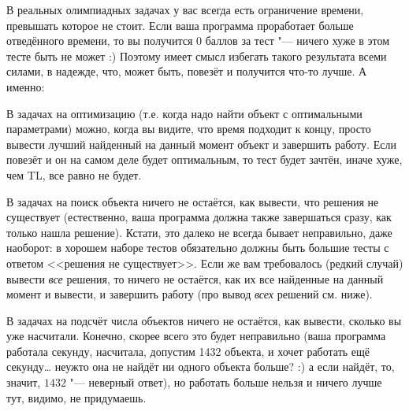 
В реальных олимпиадных задачах у вас всегда есть ограничение времени, превышать которое не 
стоит. Если ваша программа проработает больше отведённого времени, то вы получится $0$ баллов за 
тест "--- ничего хуже в этом тесте быть не может :) Поэтому имеет смысл избегать такого 
результата всеми силами, в надежде, что, может быть, повезёт и получится что-то лучше. А именно:

\begin{ulist}
\item В задачах на оптимизацию (т.е. когда надо найти объект с оптимальными параметрами) можно, 
  когда вы видите, что время подходит к концу, просто вывести лучший найденный на данный 
  момент объект и завершить работу. Если повезёт и он на самом деле будет 
  оптимальным, то тест будет зачтён, иначе хуже, чем TL, все равно не будет.
\item В задачах на поиск объекта ничего не остаётся, как вывести, что решения не 
  существует (естественно, ваша программа должна также завершаться сразу, как только нашла решение). Кстати, это далеко не всегда бывает неправильно, даже наоборот: в хорошем наборе тестов обязательно должны быть большие тесты с ответом <<решения не существует>>.
  Если же вам требовалось (редкий случай) вывести \textit{все} решения, то ничего не 
  остаётся, как их все найденные на данный момент и вывести, и завершить работу (про вывод 
  \textit{всех} решений см. ниже).
\item В задачах на подсчёт числа объектов ничего не остаётся, как вывести, сколько 
  вы уже насчитали. Конечно, скорее всего это будет неправильно (ваша программа 
  работала секунду, насчитала, допустим 1432 объекта, и хочет работать ещё 
  секунду\dots{} неужто она не найдёт ни одного объекта больше? :) а если найдёт, 
  то, значит, $1432$ "--- неверный ответ), но работать больше нельзя и ничего 
  лучше тут, видимо, не придумаешь.
\end{ulist}
  
  

